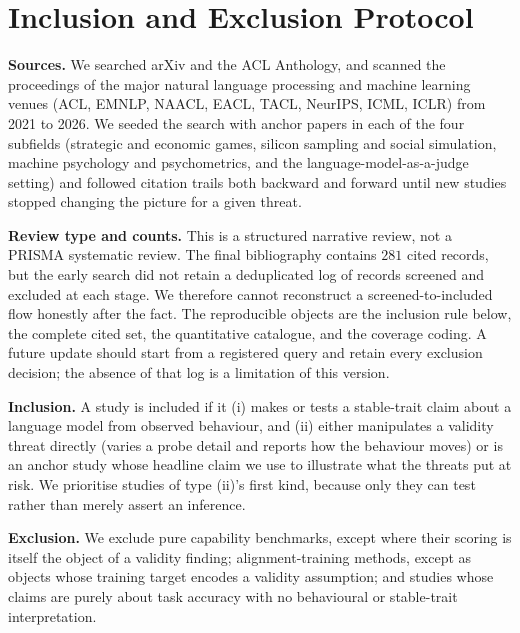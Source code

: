 \documentclass[11pt]{article}
\begin{document}
\clearpage
\section{Inclusion and Exclusion Protocol}
\label{app:protocol}

\textbf{Sources.} We searched arXiv and the ACL Anthology, and scanned the
proceedings of the major natural language processing and machine learning
venues (ACL, EMNLP, NAACL, EACL, TACL, NeurIPS, ICML, ICLR) from 2021 to 2026.
We seeded the search with anchor papers in each of the four subfields
(strategic and economic games, silicon sampling and social simulation,
machine psychology and psychometrics, and the language-model-as-a-judge
setting) and followed citation trails both backward and forward until new
studies stopped changing the picture for a given threat.

\textbf{Review type and counts.} This is a structured narrative review, not a
PRISMA systematic review. The final bibliography contains $281$ cited records,
but the early search did not retain a deduplicated log of records screened and
excluded at each stage. We therefore cannot reconstruct a screened-to-included
flow honestly after the fact. The reproducible objects are the inclusion rule
below, the complete cited set, the quantitative catalogue, and the coverage
coding. A future update should start from a registered query and retain every
exclusion decision; the absence of that log is a limitation of this version.

\textbf{Inclusion.} A study is included if it (i) makes or tests a
stable-trait claim about a language model from observed behaviour, and
(ii) either manipulates a validity threat directly (varies a probe detail and
reports how the behaviour moves) or is an anchor study whose headline claim we
use to illustrate what the threats put at risk. We prioritise studies of type
(ii)'s first kind, because only they can test rather than merely assert an
inference.

\textbf{Exclusion.} We exclude pure capability benchmarks, except where their
scoring is itself the object of a validity finding; alignment-training
methods, except as objects whose training target encodes a validity
assumption; and studies whose claims are purely about task accuracy with no
behavioural or stable-trait interpretation.
\end{document}
